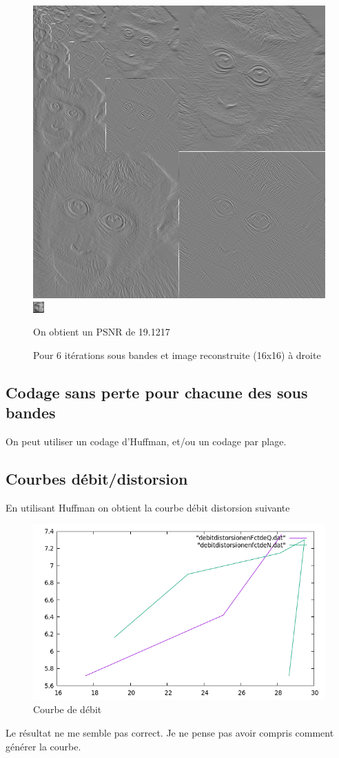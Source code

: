 \documentclass{article}
\begin{document}
\begin{figure}[h!]
\centerline{ \includegraphics[scale=0.5]{./rendus/4sousBandes6iterPGM.png} \includegraphics[scale=16]{./rendus/Reconstruite6.png} }
\caption{Pour 6 itérations  sous bandes et image reconstruite (16x16) à droite} 
On obtient un PSNR de 19.1217
\end{figure}


\newpage
\subsection{Codage sans perte pour chacune des sous bandes}
On peut utiliser un codage d'Huffman, et/ou un codage par plage.

\subsection{Courbes débit/distorsion}
En utilisant Huffman on obtient la courbe débit distorsion suivante
\begin{figure}[h!]
\centerline{ \includegraphics[scale=0.5]{./rendus/debit.png}}
\caption{Courbe de débit}
\end{figure}
Le résultat ne me semble pas correct.
Je ne pense pas avoir compris comment générer la courbe.
\end{document}
